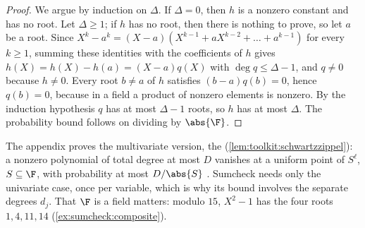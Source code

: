 \begin{refsection}
\begin{proof}
We argue by induction on $\Delta$. If $\Delta=0$, then $h$ is a nonzero constant and has no root. Let $\Delta\ge1$; if $h$ has no root, then there is nothing to prove, so let $a$ be a root. Since $X^k-a^k=(X-a)(X^{k-1}+aX^{k-2}+\dots+a^{k-1})$ for every $k\ge1$, summing these identities with the coefficients of $h$ gives $h(X)=h(X)-h(a)=(X-a)q(X)$ with $\deg q\le\Delta-1$, and $q\ne0$ because $h\ne0$. Every root $b\ne a$ of $h$ satisfies $(b-a)q(b)=0$, hence $q(b)=0$, because in a field a product of nonzero elements is nonzero. By the induction hypothesis $q$ has at most $\Delta-1$ roots, so $h$ has at most $\Delta$. The probability bound follows on dividing by $\abs{\F}$.
\end{proof}

The appendix proves the multivariate version, the  (\cref{lem:toolkit:schwartzzippel}): a nonzero polynomial of total degree at most $D$ vanishes at a uniform point of $S^\ell$, $S\subseteq\F$, with probability at most $D/\abs{S}$ \parencite{DeMilloLipton1978,Zippel1979,Schwartz1980}. Sumcheck needs only the univariate case, once per variable, which is why its bound involves the separate degrees $d_j$. That $\F$ is a field matters: modulo $15$, $X^2-1$ has the four roots $1,4,11,14$ (\cref{ex:sumcheck:composite}).



\end{refsection}
